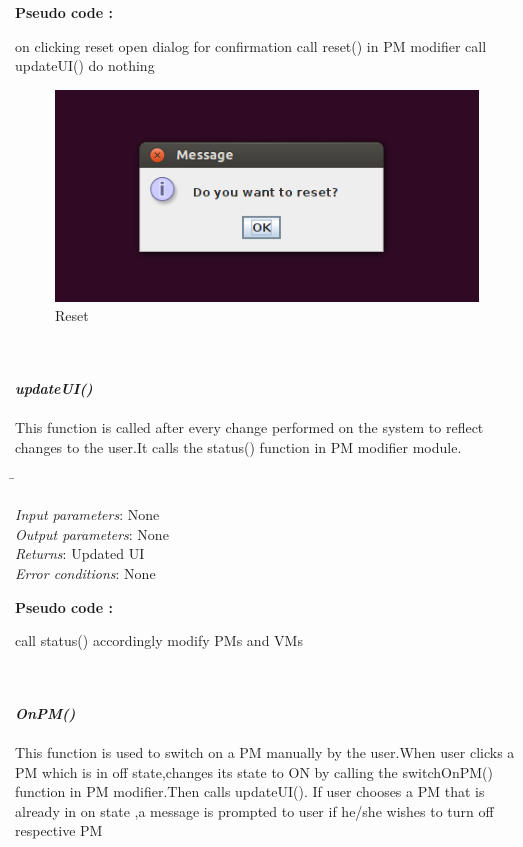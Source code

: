\documentclass{article}
\begin{document}
\textbf{Pseudo code :}
\begin{algorithmic}[1]
\STATE on clicking reset
\STATE open dialog for confirmation
\STATE call reset() in PM modifier
\STATE call updateUI()
\ELSE 
\STATE do nothing
\ENDIF
\end{algorithmic}
\begin{figure}[ht!]
\centering
\includegraphics[scale=0.6, angle=0]{6.png}
\caption{Reset}
\end{figure} 
\mbox{}\\\\
\emph{\bf updateUI()}\\\\
This function is called after every change performed on the system to reflect changes to the user.It calls the status() function in PM modifier module.
\\\begin{tabbing}
  \hspace*{4cm}\= \kill

\emph{Input parameters}\>: None
\\
\emph{Output parameters}\>: None\\
\emph{Returns}\>: Updated UI\\
\emph{Error conditions}\>: None\\
\end{tabbing}
\textbf{Pseudo code :}
\begin{algorithmic}[1]
 \STATE call status()
 \STATE accordingly modify PMs and VMs
\end{algorithmic}
\mbox{}\\\\
\emph{\bf OnPM()}\\\\
This function is used to switch on a PM manually by the user.When user clicks a PM  which is in off state,changes its state to ON by calling the switchOnPM() function in PM modifier.Then calls updateUI().
If user chooses a PM that is already in on state ,a message is prompted to user if he/she wishes to turn off respective PM
\end{document}
